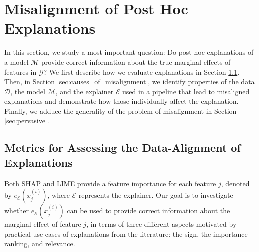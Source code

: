 \documentclass[mnsc,blindrev]{informs3}
\newcommand{\mD}{\mathcal{D}}
\newcommand{\mM}{\mathcal{M}}
\newcommand{\mE}{\mathcal{E}}
\begin{document}








\section{Misalignment of Post Hoc Explanations}
  In this section, we study a most important question: Do post hoc explanations of a model $\mathcal{M}$ provide correct information about the true marginal effects of features in $\mathcal{G}$? We first describe how we evaluate explanations in Section \ref{sec:evaluating_faithfulness}. 
  Then, in Section \ref{sec:causes_of_misalignment}, we identify properties of the data $\mD$, the model $\mM$, and the explainer $\mE$ used in a pipeline that lead to misaligned explanations and demonstrate how those individually affect the explanation. Finally, we adduce the generality of the problem of misalignment in Section \ref{sec:pervasive}. %

\subsection{Metrics for Assessing the Data-Alignment of Explanations}
   \label{sec:evaluating_faithfulness}
  Both SHAP and LIME provide a feature importance for each feature $j$, denoted by $e_\mE(x^{(i)}_j)$, where $\mE$ represents the explainer. 
   Our goal is to investigate whether $e_\mE(x^{(i)}_j)$ can be used to provide correct information about the marginal effect of feature $j$, in terms of three different aspects motivated by practical use cases of explanations from the literature: the sign, the importance ranking, and relevance. 
     
\end{document}

